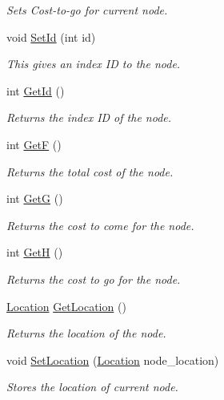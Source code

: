 \begin{DoxyCompactItemize}
\begin{DoxyCompactList}\small\item\em Sets Cost-\/to-\/go for current node. \end{DoxyCompactList}\item 
void \hyperlink{classNode_a515ad64c840bbb80d7958203faf55584}{Set\+Id} (int id)
\begin{DoxyCompactList}\small\item\em This gives an index ID to the node. \end{DoxyCompactList}\item 
int \hyperlink{classNode_ae90214a3ccf4ead8527329bbe238570c}{Get\+Id} ()
\begin{DoxyCompactList}\small\item\em Returns the index ID of the node. \end{DoxyCompactList}\item 
int \hyperlink{classNode_aeec24ba9086dfa447b1f6b7ad429556e}{GetF} ()
\begin{DoxyCompactList}\small\item\em Returns the total cost of the node. \end{DoxyCompactList}\item 
int \hyperlink{classNode_a777bb71e0b5ac4185ec90265d79588e7}{GetG} ()
\begin{DoxyCompactList}\small\item\em Returns the cost to come for the node. \end{DoxyCompactList}\item 
int \hyperlink{classNode_a4a8b3e5322f37c817217cdb20eb920dc}{GetH} ()
\begin{DoxyCompactList}\small\item\em Returns the cost to go for the node. \end{DoxyCompactList}\item 
\hyperlink{structLocation}{Location} \hyperlink{classNode_ae8a71f87f6b9042f6e4ae17dd45b2a20}{Get\+Location} ()
\begin{DoxyCompactList}\small\item\em Returns the location of the node. \end{DoxyCompactList}\item 
void \hyperlink{classNode_af16ff69ab235ae2f2270a5f8f2b9816a}{Set\+Location} (\hyperlink{structLocation}{Location} node\+\_\+location)
\begin{DoxyCompactList}\small\item\em Stores the location of current node. \end{DoxyCompactList}\end{DoxyCompactItemize}


